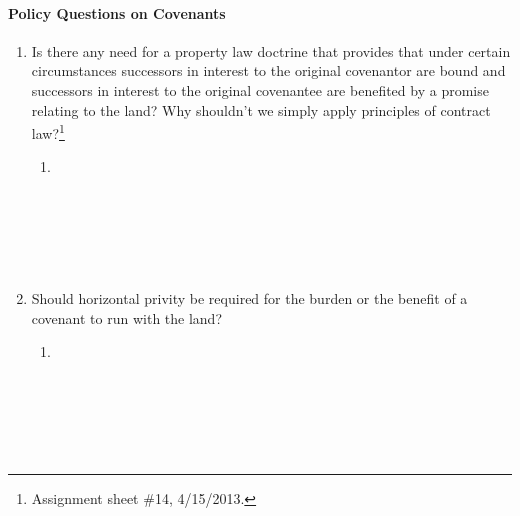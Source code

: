 \paragraph{Policy Questions on Covenants}

\begin{enumerate}
    \item Is there any need for a property law doctrine that provides that 
    under certain circumstances successors in interest to the original 
    covenantor are bound and successors in interest to the original covenantee 
    are benefited by a promise relating to the land? Why shouldn't we simply 
    apply principles of contract law?\footnote{Assignment sheet \#14, 
    4/15/2013.}
    \begin{enumerate}
        \item ~\\\\\\\\\\\\ %
    \end{enumerate}
    \item Should horizontal privity be required for the burden or the benefit 
    of a covenant to run with the land?
    \begin{enumerate}
        \item ~\\\\\\\\\\\\ %
    \end{enumerate}
\end{enumerate}

